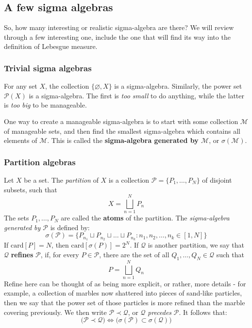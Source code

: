 \subsection{A few sigma algebras}
So, how many interesting or realistic sigma-algebra are there? We will review through a few interesting one, include the one that will find its way into the definition of Lebesgue measure. 

\subsubsection{Trivial sigma algebras}
For any set $X$, the collection $\{ \varnothing,X \}$ is a sigma-algebra. Similarly, the power set $\mathcal{P}(X)$ is a sigma-algebra. The first is \textit{too small} to do anything, while the latter is \textit{too big} to be manageable. 

One way to create a manageable sigma-algebra is to start with some collection $\mathcal{M}$ of manageable sets, and then find the smallest sigma-algebra which contains all elements of $\mathcal{M}$. This is called the \textbf{sigma-algebra generated by $\mathcal{M}$}, or $\sigma(\mathcal{M})$. 

\subsubsection{Partition algebras}
Let $X$ be a set. The \textit{partition} of $X$ is a collection $\mathcal{P}=\{ P_{1},\dots,P_{N} \}$ of disjoint subsets, such that $$X=\bigsqcup_{n=1}^{N}P_{n}$$
The sets $P_{1},\dots,P_{N}$ are called the \textbf{atoms} of the partition. The \textit{sigma-algebra generated by $\mathcal{P}$} is defined by: $$\sigma(\mathcal{P})=\{ P_{n_{1}}\sqcup P_{n_{2}}\sqcup\dots\sqcup P_{n_{k}}: n_{1},n_{2},\dots,n_{k}\in [1,N] \}$$
If $\mathrm{card}[P]=N$, then $\mathrm{card}[\sigma(P)]=2^{N}$. If $\mathcal{Q}$ is another partition, we say that $\mathcal{Q}$ \textbf{refines} $\mathcal{P}$, if, for every $P\in\mathcal{P}$, there are the set of all $Q_{1},\dots,Q_{N}\in \mathcal{Q}$ such that $$P=\bigsqcup_{n=1}^{N}Q_{n}$$
Refine here can be thought of as being more explicit, or rather, more details - for example, a collection of marbles now shattered into pieces of sand-like particles, then we say that the power set of those particles is more refined than the marble covering previously. We then write $\mathcal{P}\prec\mathcal{Q}$, or $\mathcal{Q}$ \textit{precedes} $\mathcal{P}$. It follows that: $$\Big( \mathcal{P}\prec\mathcal{Q} \Big)\iff\Big( \sigma(\mathcal{P})\subset \sigma(\mathcal{Q})   \Big)$$

